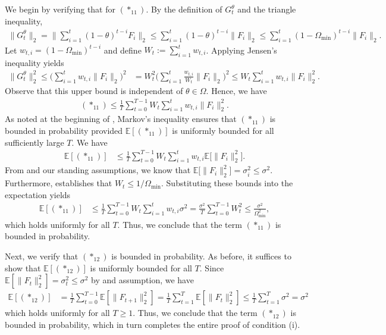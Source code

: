 \documentclass[a4paper, 11pt]{article}
\newcommand{\E}{\mathbb E}
\theoremstyle{definition}
\begin{document}
We begin by verifying that for $(*_{11})$.
By the definition of $G_t^\theta$ and the triangle inequality,
\begin{align}
    \big\| G_t^\theta \big\|_2 = \bigg\| \sum_{i=1}^t (1-\theta)^{t-i} F_i \bigg\|_2 \le \sum_{i=1}^t (1 - \theta)^{t-i} \| F_i \|_2 \le \sum_{i=1}^t (1 - \Omega_{\text{min}})^{t-i} \| F_i \|_2 .
\end{align}
Let $w_{t,i} = (1 - \Omega_{\text{min}})^{t-i}$ and define $W_t := \sum_{i=1}^{t} w_{t,i}$.
Applying Jensen's inequality yields
\begin{align}
	\big\| G_t^\theta \big\|_2^2 \le \bigg( \sum_{i=1}^{t} w_{t,i} \| F_i \|_2 \bigg)^2 & = W_t^2 \bigg( \sum_{i=1}^{t} \frac{w_{t,i}}{W_t} \| F_i \|_2 \bigg)^2 \le W_t \sum_{i=1}^{t} w_{t,i} \| F_i \|_2^2 .
\end{align}
Observe that this upper bound is independent of $\theta \in \Omega$.
Hence, we have
\begin{align}
	(*_{11}) \le \frac{1}{T} \sum_{t=0}^{T-1} W_t \sum_{i=1}^{t} w_{t,i} \| F_i \|_2^2 .
\end{align}
As noted at the beginning of , Markov's inequality ensures that $(*_{11})$ is bounded in probability provided $\E[ (*_{11}) ]$ is uniformly bounded for all sufficiently large $T$.
We have
\begin{align}
	\E[ (*_{11}) ] & \le \frac{1}{T} \sum_{t=0}^{T-1} W_t \sum_{i=1}^{t} w_{t,i} \E\big[ \| F_i \|_2^2 \big] .
\end{align}
From  and our standing assumptions, we know that $\E\big[ \| F_i \|_2^2 \big] = \sigma_i^2 \le \sigma^2$. 
Furthermore,  establishes that $W_t \le 1 / \Omega_{\text{min}}$.
Substituting these bounds into the expectation yields
\begin{align}
	\E[ (*_{11}) ] & \le \frac{1}{T} \sum_{t=0}^{T-1} W_t \sum_{i=1}^{t} w_{t,i} \sigma^2 = \frac{\sigma^2}{T} \sum_{t=0}^{T-1} W_t^2 \le \frac{\sigma^2}{\Omega_{\text{min}}^2} ,
\end{align}
which holds uniformly for all $T$.
Thus, we conclude that the term $(*_{11})$ is bounded in probability.

Next, we verify that $(*_{12})$ is bounded in probability.
As before, it suffices to show that $\E[ (*_{12}) ]$ is uniformly bounded for all $T$.
Since $\E[ \| F_t \|_2^2 ] = \sigma_t^2 \le \sigma^2$ by  and assumption, we have
\begin{align}
	\E[ (*_{12}) ] & = \frac{1}{T} \sum_{t=0}^{T-1} \E[ \| F_{t+1} \|_2^2 ] = \frac{1}{T} \sum_{t=1}^{T} \E[ \| F_{t} \|_2^2 ] \le \frac{1}{T} \sum_{t=1}^{T} \sigma^2 = \sigma^2
\end{align}
which holds uniformly for all $T \ge 1$.
Thus, we conclude that the term $(*_{12})$ is bounded in probability, which in turn completes the entire proof of condition (i).
\end{document}
